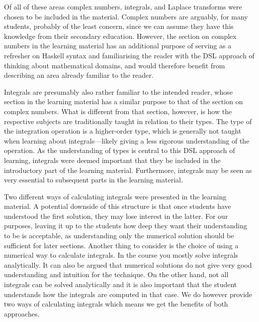 Of all of these areas complex numbers, integrals, and Laplace transforms were chosen to be included in the material. Complex numbers are arguably, for many students, probably of the least concern, since we can assume they have this knowledge from their secondary education. However, the section on complex numbers in the learning material has an additional purpose of serving as a refresher on \gls{Haskell} syntax and familiarising the reader with the \gls{DSL} approach of thinking about mathematical domains, and would therefore benefit from describing an area already familiar to the reader. 

Integrals are presumably also rather familiar to the intended reader, whose section in the learning material has a similar purpose to that of the section on complex numbers. What is different from that section, however, is how the respective subjects are traditionally taught in relation to their types. The type of the integration operation is a higher-order type, which is generally not taught when learning about integrals---likely giving a less rigorous understanding of the operation. As the understanding of types is central to this \gls{DSL} approach of learning, integrals were deemed important that they be included in the introductory part of the learning material. Furthermore, integrals may be seen as very essential to subsequent parts in the learning material. 

Two different ways of calculating integrals were presented in the learning material. A potential downside of this structure is that once students have understood the first solution, they may lose interest in the latter. For our purposes, leaving it up to the students how deep they want their understanding to be is acceptable, as understanding only the numerical solution should be sufficient for later sections. Another thing to consider is the choice of using a numerical way to calculate integrals. In the course you mostly solve integrals analytically. It can also be argued that numerical solutions do not give very good understanding and intuition for the technique. On the other hand, not all integrals can be solved analytically and it is also important that the student understands how the integrals are computed in that case. We do however provide two ways of calculating integrals which means we get the benefits of both approaches.

